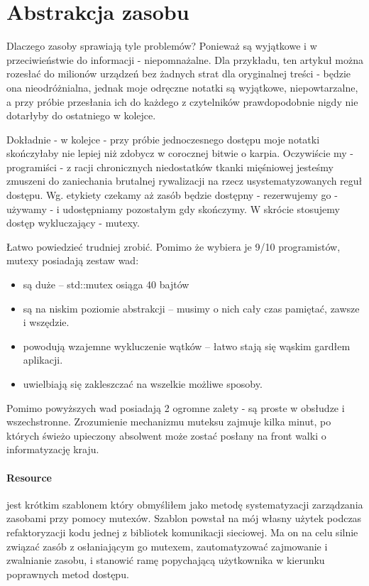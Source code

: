 \section{Abstrakcja zasobu}\label{sec:resource}
Dlaczego zasoby sprawiają tyle problemów? Ponieważ są wyjątkowe i w przeciwieństwie do informacji - niepomnażalne. Dla przykładu, ten artykuł można rozesłać do milionów urządzeń bez żadnych strat dla oryginalnej treści - będzie ona nieodróżnialna, jednak moje odręczne notatki są wyjątkowe, niepowtarzalne, a przy próbie przesłania ich do każdego z czytelników prawdopodobnie nigdy nie dotarłyby do ostatniego w kolejce.

Dokładnie - w kolejce - przy próbie jednoczesnego dostępu moje notatki skończyłaby nie lepiej niż zdobycz w corocznej bitwie o karpia. Oczywiście my - programiści - z racji chronicznych niedostatków tkanki mięśniowej jesteśmy zmuszeni do zaniechania brutalnej rywalizacji na rzecz usystematyzowanych reguł dostępu. Wg. etykiety czekamy aż zasób będzie dostępny - rezerwujemy go - używamy - i udostępniamy pozostałym gdy skończymy. W skrócie stosujemy dostęp wykluczający - mutexy.

Łatwo powiedzieć trudniej zrobić. Pomimo że wybiera je 9/10 programistów, mutexy posiadają zestaw wad:
\begin{itemize}
\item są duże -- std::mutex osiąga 40 bajtów
\item są na niskim poziomie abstrakcji -- musimy o nich cały czas pamiętać, zawsze i wszędzie.
\item powodują wzajemne wykluczenie wątków -- łatwo stają się wąskim gardłem aplikacji.
\item uwielbiają się zakleszczać na wszelkie możliwe sposoby.
\end{itemize}
Pomimo powyższych wad posiadają 2 ogromne zalety - są proste w obsłudze i wszechstronne. Zrozumienie mechanizmu muteksu zajmuje kilka minut, po których świeżo upieczony absolwent może zostać posłany na front walki o informatyzację kraju.

\paragraph{Resource}
 jest krótkim szablonem który obmyśliłem jako metodę systematyzacji zarządzania zasobami przy pomocy mutexów. Szablon powstał na mój własny użytek podczas refaktoryzacji kodu jednej z bibliotek komunikacji sieciowej. Ma on na celu silnie związać zasób z osłaniającym go mutexem, zautomatyzować zajmowanie i zwalnianie zasobu, i stanowić ramę popychającą użytkownika w kierunku poprawnych metod dostępu.


